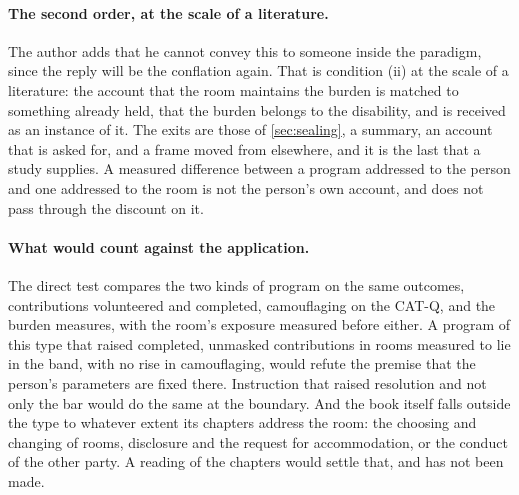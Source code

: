 \paragraph{The second order, at the scale of a literature.} The author adds that he cannot convey this to someone inside the paradigm, since the reply will be the conflation again. That is condition (ii) at the scale of a literature: the account that the room maintains the burden is matched to something already held, that the burden belongs to the disability, and is received as an instance of it. The exits are those of \autoref{sec:sealing}, a summary, an account that is asked for, and a frame moved from elsewhere, and it is the last that a study supplies. A measured difference between a program addressed to the person and one addressed to the room is not the person's own account, and does not pass through the discount on it.

\paragraph{What would count against the application.} The direct test compares the two kinds of program on the same outcomes, contributions volunteered and completed, camouflaging on the CAT-Q, and the burden measures, with the room's exposure measured before either. A program of this type that raised completed, unmasked contributions in rooms measured to lie in the band, with no rise in camouflaging, would refute the premise that the person's parameters are fixed there. Instruction that raised resolution and not only the bar would do the same at the boundary. And the book itself falls outside the type to whatever extent its chapters address the room: the choosing and changing of rooms, disclosure and the request for accommodation, or the conduct of the other party. A reading of the chapters would settle that, and has not been made.

